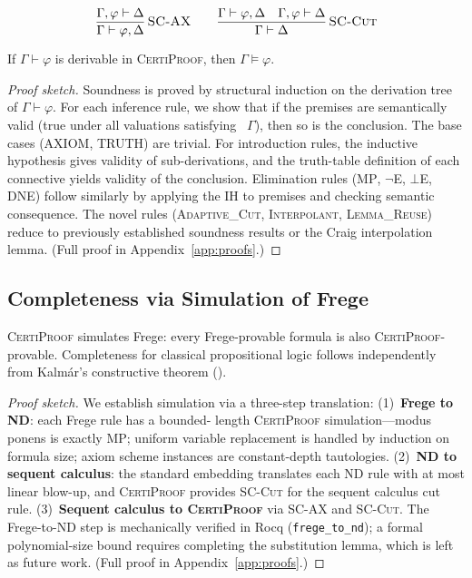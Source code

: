 \documentclass[acmtocl,review,anonymous]{acmart}
\newcommand{\entails}{\vDash}
\newcommand{\proves}{\vdash}
\newcommand{\dlnot}{\neg}
\newcommand{\dlbot}{\bot}
\newcommand{\CP}{\textsc{CertiProof}}
\newcommand{\infrule}[3]{
  \dfrac{\displaystyle #2}{\displaystyle #3}\,\textsc{#1}
}
\begin{document}
\medskip
\begin{gather}
  \infrule{SC-AX}
    {\Gamma, \varphi \proves \Delta}
    {\Gamma \proves \varphi, \Delta}
  \qquad
  \infrule{SC-Cut}
    {\Gamma \proves \varphi, \Delta \quad
     \Gamma, \varphi \proves \Delta}
    {\Gamma \proves \Delta}
  \label{eq:sc-bridge}
\end{gather}

\begin{theorem}[Soundness]
  \label{thm:soundness}
  If $\Gamma \proves \varphi$ is derivable in \CP{}, then
  $\Gamma \entails \varphi$.
\end{theorem}
\begin{proof}[Proof sketch]
  Soundness is proved by structural induction on the derivation tree of
  $\Gamma \proves \varphi$.  For each inference rule, we show that if the
  premises are semantically valid (true under all valuations satisfying
 ~$\Gamma$), then so is the conclusion.  The base cases
  (\textsc{AXIOM}, \textsc{TRUTH}) are trivial.  For introduction rules,
  the inductive hypothesis gives validity of sub-derivations, and the
  truth-table definition of each connective yields validity of the
  conclusion.  Elimination rules (\textsc{MP}, \textsc{$\dlnot$E},
  \textsc{$\dlbot$E}, \textsc{DNE}) follow similarly by applying the IH
  to premises and checking semantic consequence.  The novel rules
  (\textsc{Adaptive\_Cut}, \textsc{Interpolant}, \textsc{Lemma\_Reuse})
  reduce to previously established soundness results or the Craig
  interpolation lemma.
  (Full proof in Appendix~\ref{app:proofs}.)
\end{proof}

\subsection{Completeness via Simulation of Frege}

\begin{theorem}
  \label{thm:completeness}
  \CP{} simulates Frege: every Frege-provable formula is also
  \CP{}-provable.  Completeness for classical propositional logic
  follows independently from Kalm\'{a}r's constructive theorem
  ().
\end{theorem}
\begin{proof}[Proof sketch]
  We establish simulation via a three-step translation: (1)~\textbf{Frege to ND}: each Frege rule has a bounded-
  length \CP{} simulation---modus ponens is exactly \textsc{MP};
  uniform variable replacement is handled by induction on formula size;
  axiom scheme instances are constant-depth tautologies.  (2)~\textbf{ND
  to sequent calculus}: the standard embedding translates each ND rule
  with at most linear blow-up, and \CP{} provides \textsc{SC-Cut} for the
  sequent calculus cut rule.  (3)~\textbf{Sequent calculus to \CP{}}
  via \textsc{SC-AX} and \textsc{SC-Cut}.  The Frege-to-ND step is
  mechanically verified in Rocq (\texttt{frege\_to\_nd}); a formal
  polynomial-size bound requires completing the substitution lemma,
  which is left as future work.
  (Full proof in Appendix~\ref{app:proofs}.)
\end{proof}
\end{document}
